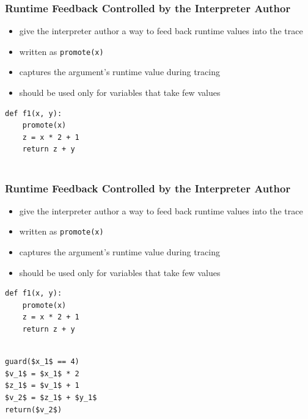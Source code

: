 \documentclass[utf8x]{beamer}
\newcommand{\noop}{}
\begin{document}
\begin{frame}[containsverbatim]
  \frametitle{Runtime Feedback Controlled by the Interpreter Author}
  \begin{itemize}
      \item give the interpreter author a way to feed back runtime values into the trace
      \item written as \texttt{promote(x)}
      \item captures the argument's runtime value during tracing
      \item should be used only for variables that take few values
  \end{itemize}

  \begin{minipage}[b]{6cm}
      \centering
      {\noop
      \begin{lstlisting}[mathescape,basicstyle=\ttfamily]
def f1(x, y):
    promote(x)
    z = x * 2 + 1
    return z + y


      \end{lstlisting}
      }
  \end{minipage}
\end{frame}

\begin{frame}[containsverbatim]
  \frametitle{Runtime Feedback Controlled by the Interpreter Author}
  \begin{itemize}
      \item give the interpreter author a way to feed back runtime values into the trace
      \item written as \texttt{promote(x)}
      \item captures the argument's runtime value during tracing
      \item should be used only for variables that take few values
  \end{itemize}
  
  \begin{minipage}[b]{6cm}
      \centering
      {\noop
      \begin{lstlisting}[mathescape,basicstyle=\ttfamily]
def f1(x, y):
    promote(x)
    z = x * 2 + 1
    return z + y


      \end{lstlisting}
      }
  \end{minipage}
  \vline
  \hspace{0.5cm}
  \begin{minipage}[b]{4cm}
      {\noop
      \begin{lstlisting}[mathescape,basicstyle=\ttfamily]
guard($x_1$ == 4)
$v_1$ = $x_1$ * 2
$z_1$ = $v_1$ + 1
$v_2$ = $z_1$ + $y_1$
return($v_2$)
      \end{lstlisting}
      }
  \end{minipage}
\end{frame}
\end{document}
